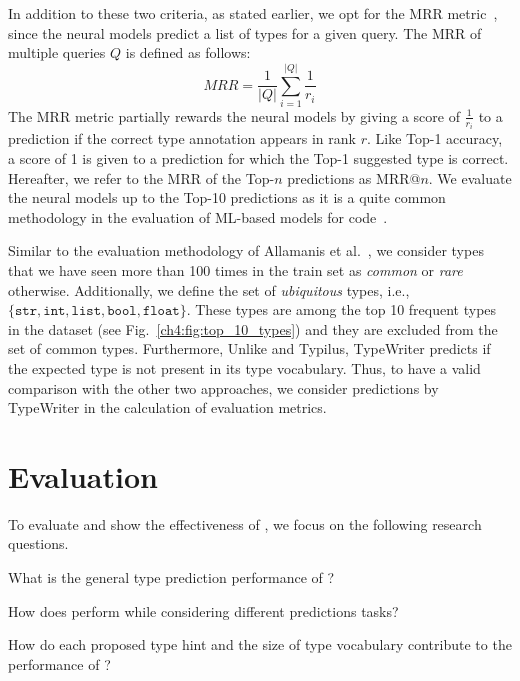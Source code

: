 In addition to these two criteria, as stated earlier, we opt for the MRR metric~\cite{manning2008introduction}, since the neural models predict a list of types for a given query. The MRR of multiple queries $Q$ is defined as follows:
\begin{equation}
MRR = \frac{1}{|Q|}\sum_{i=1}^{|Q|}{\frac{1}{r_{i}}}
\end{equation}
The MRR metric partially rewards the neural models by giving a score of $\frac{1}{r_{i}}$ to a prediction if the correct type annotation appears in rank $r$. Like Top-1 accuracy, a score of 1 is given to a prediction for which the Top-1 suggested type is correct. Hereafter, we refer to the MRR of the Top-$n$ predictions as MRR@$n$. We evaluate the neural models up to the Top-10 predictions as it is a quite common methodology in the evaluation of ML-based models for code~\cite{ he2021pyart, allamanis2020typilus, pradel2019typewriter}.

Similar to the evaluation methodology of Allamanis et al.~\cite{allamanis2020typilus}, we consider types that we have seen more than 100 times in the train set as \emph{common} or \emph{rare} otherwise. Additionally, we define the set of \emph{ubiquitous} types, i.e., $\{\texttt{str}, \texttt{int}, \texttt{list}, \texttt{bool}, \texttt{float}\}$. These types are among the top 10 frequent types in the dataset (see Fig.~\ref{ch4:fig:top_10_types}) and they are excluded from the set of common types. Furthermore, Unlike \name and Typilus, TypeWriter predicts  if the expected type is not present in its type vocabulary. Thus, to have a valid comparison with the other two approaches, we consider  predictions by TypeWriter in the calculation of evaluation metrics.

\newpage

\section{Evaluation}
\label{ch4:sec:eval}

To evaluate and show the effectiveness of \name, we focus on the following research questions.

\begin{description}[noitemsep]
	\item[\RQ{1}] What is the general type prediction performance of \name? 
	\item[\RQ{2}] How does \name perform while considering different predictions tasks?
	\item[\RQ{3}] How do each proposed type hint and the size of type vocabulary contribute to the performance of \name?
\end{description}

